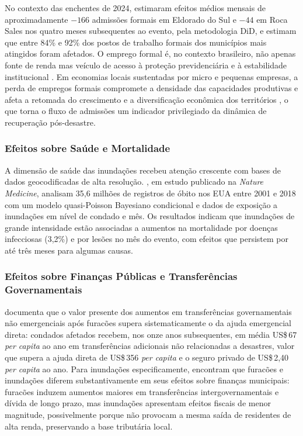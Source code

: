 \documentclass[a4paper,12pt]{article}
\begin{document}
No contexto das enchentes de 2024,  estimaram efeitos médios
mensais de aproximadamente $-166$ admissões formais em Eldorado do Sul e $-44$ em
Roca Sales nos quatro meses subsequentes ao evento, pela metodologia DiD, e
 estimam que entre 84\% e 92\% dos postos de trabalho formais dos
municípios mais atingidos foram afetados. O emprego formal é, no contexto brasileiro, não
apenas fonte de renda mas veículo de acesso à proteção previdenciária e à estabilidade
institucional \cite{krein2012, montagner2003}. Em economias locais sustentadas por
micro e pequenas empresas, a perda de empregos formais compromete a densidade das
capacidades produtivas e afeta a retomada do crescimento e a diversificação econômica
dos territórios \cite{oclery2024}, o que torna o fluxo de admissões um indicador
privilegiado da dinâmica de recuperação pós-desastre.


\subsubsection{Efeitos sobre Saúde e Mortalidade}

A dimensão de saúde das inundações recebeu atenção crescente com bases de dados
geocodificadas de alta resolução. , em estudo publicado na
\textit{Nature Medicine}, analisam 35,6 milhões de registros de óbito nos EUA entre 2001
e 2018 com um modelo quasi-Poisson Bayesiano condicional e dados de exposição a
inundações em nível de condado e mês. Os resultados indicam que inundações de grande
intensidade estão associadas a aumentos na mortalidade por doenças infecciosas (3,2\%) e
por lesões no mês do evento, com efeitos que persistem por até três meses para algumas
causas.
\subsubsection{Efeitos sobre Finanças Públicas e Transferências Governamentais}

 documenta que o valor presente dos aumentos em
transferências governamentais não emergenciais após furacões supera sistematicamente o
da ajuda emergencial direta: condados afetados recebem, nos onze anos subsequentes, em
média US\$\,67 \textit{per capita} ao ano em transferências adicionais não relacionadas a
desastres, valor que supera a ajuda direta de US\$\,356 \textit{per capita} e o seguro
privado de US\$\,2,40 \textit{per capita} ao ano. Para inundações especificamente,
 encontram que furacões e inundações diferem substantivamente em
seus efeitos sobre finanças municipais: furacões induzem aumentos maiores em
transferências intergovernamentais e dívida de longo prazo, mas inundações apresentam
efeitos fiscais de menor magnitude, possivelmente porque não provocam a mesma saída de
residentes de alta renda, preservando a base tributária local.
\end{document}

